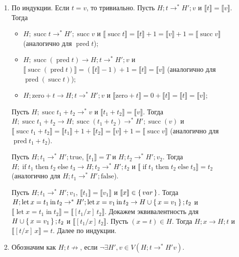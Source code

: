 \documentclass{article}
\DeclareMathOperator{\tsucc}{succ}
\DeclareMathOperator{\tpred}{pred}
\DeclareMathOperator{\tlet}{let}
\DeclareMathOperator{\tin}{in}
\DeclareMathOperator{\tthen}{then}
\DeclareMathOperator{\telse}{else}
\DeclareMathOperator{\tif}{if}
\begin{document}
\begin{enumerate}
        \begin{enumerate}
            \item По индукции. Если $t = v$, то тривиально. Пусть $H;t\to^* H';v$ и $\llbracket t \rrbracket = \llbracket v \rrbracket $. Тогда 
            \begin{itemize}
                \item $H;\tsucc t \to^* H';\tsucc v$ и $\llbracket \tsucc t \rrbracket = \llbracket t \rrbracket  + 1 = \llbracket v \rrbracket + 1 = \llbracket \tsucc v \rrbracket $ (аналогично для $\tpred t$); 
                \item $H;\tsucc(\tpred t) \to H;t \to^* H';v$ и $\llbracket \tsucc(\tpred t) \rrbracket = (\llbracket t \rrbracket - 1) + 1 = \llbracket t \rrbracket  = \llbracket v \rrbracket $ (аналогично для $\tpred(\tsucc t)$); 
                \item $H;\mathrm{zero} + t \to H;t \to^* H';v$ и $\llbracket \mathrm{zero} + t \rrbracket = 0 + \llbracket t \rrbracket = \llbracket t \rrbracket = \llbracket v \rrbracket$;
            \end{itemize}
            Пусть $H;\tsucc t_1 + t_2 \to^* v$ и $\llbracket t_1 + t_2 \rrbracket = \llbracket v \rrbracket $. Тогда $H;\tsucc t_1 + t_2 \to H;\tsucc(t_1 + t_2) \to^* H';\tsucc(v)$ и $\llbracket \tsucc t_1 + t_2 \rrbracket = \llbracket t_1 \rrbracket  + 1 + \llbracket t_2 \rrbracket = \llbracket v \rrbracket + 1 = \llbracket \tsucc v \rrbracket$ (аналогично для $\tpred t_1 + t_2$).
    
            Пусть $H;t_1 \to^* H';\mathrm{true}$, $\llbracket t_1 \rrbracket = T$ и $H;t_2 \to^* H';v_2$. Тогда $H;\tif t_1 \tthen t_2 \telse t_3 \to H;t_2 \to^* H';t_2$ и $\llbracket \tif t_1 \tthen t_2 \telse t_3 \rrbracket = t_2$  (аналогично для $H;t_1 \to^* H';\mathrm{false}$).

            
            Пусть $H;t_1 \to^* H';v_1 $, $\llbracket t_1 \rrbracket = \llbracket v_1 \rrbracket$ и $\llbracket x \rrbracket \in \set{var}$. Тогда $H;\tlet x = t_1 \tin t_2 \to^* H';\tlet x = v_1 \tin t_2 \to H\cup\set{x = v_1};t_2$ и $\llbracket \tlet x = t_1 \tin t_2 \rrbracket = \llbracket [t_1/x]\,t_2 \rrbracket$. Докажем эквивалентность для $H\cup\set{x = v_1};t_2$ и $\llbracket [t_1/x]\,t_2 \rrbracket $. Пусть $(x=t)\in H$. Тогда $H;x\to H;t$ и $\llbracket [t/x]\,x \rrbracket = t$. Далее по индукции.

            \item Обозначим как $H;t \not\to$, если $\neg\exists H',v \in V (H;t\to^* H'v)$.
            

\end{enumerate}
\end{enumerate}
\end{document}
